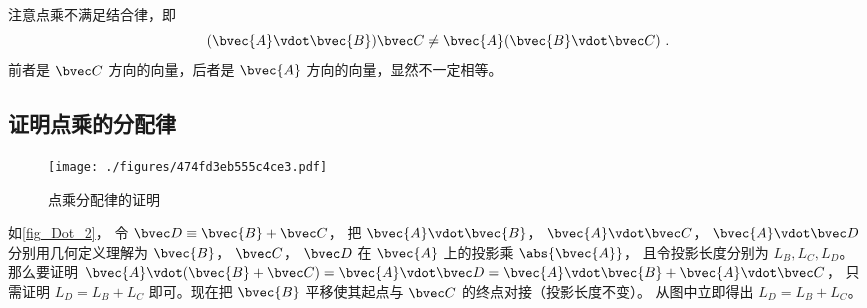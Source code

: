 注意点乘不满足结合律，即
\begin{equation}
(\bvec{A} \vdot \bvec{B}) \bvec C \ne  \bvec{A} (\bvec{B} \vdot \bvec C)~.
\end{equation}
前者是 $\bvec C$ 方向的向量，后者是 $\bvec{A}$ 方向的向量，显然不一定相等。

\subsection{证明点乘的分配律}
\begin{figure}[ht]
\centering
\texttt{[image: ./figures/474fd3eb555c4ce3.pdf]}
\caption{点乘分配律的证明} \label{fig_Dot_2}
\end{figure}

如\autoref{fig_Dot_2}， 令 $\bvec D \equiv \bvec{B} + \bvec C$， 把 $\bvec{A} \vdot \bvec{B}$，  $\bvec{A} \vdot \bvec C$，  $\bvec{A} \vdot \bvec D$ 分别用几何定义理解为 $\bvec{B}$，  $\bvec C$，  $\bvec D$ 在 $\bvec{A}$ 上的投影乘 $\abs{\bvec{A}}$， 且令投影长度分别为 $L_B, L_C, L_D$。 那么要证明 $\bvec{A} \vdot (\bvec{B} + \bvec C) = \bvec{A} \vdot \bvec D = \bvec{A} \vdot \bvec{B} + \bvec{A} \vdot \bvec C$， 只需证明 $L_D = L_B + L_C$ 即可。现在把 $\bvec{B}$ 平移使其起点与 $\bvec C$ 的终点对接（投影长度不变）。 从图中立即得出 $L_D = L_B + L_C$。  
